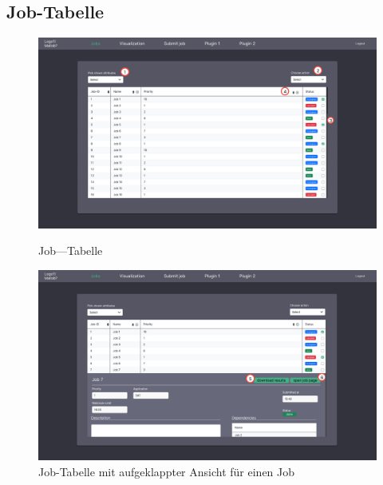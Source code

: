 \subsection{Job-Tabelle}
\label{pages:job-table}
\begin{figure}[H]
    \centering
    \includegraphics[width=\textwidth]{images-interface/v3_interface/job_table_page_collapsed_v3.pdf}
    \caption{Job—Tabelle}
    \label{fig:job-table-col}

    \includegraphics[width=\textwidth]{images-interface/v3_interface/job_table_expanded_v3.pdf}
    \caption{Job-Tabelle mit aufgeklappter Ansicht für einen Job}
    \label{fig:job-table-exp}
\end{figure}


